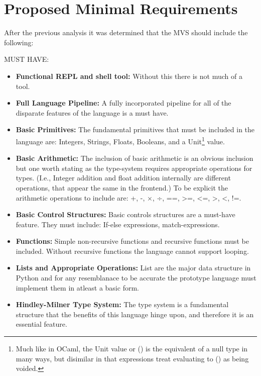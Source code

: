 \documentclass{l4proj}
\begin{document}


\section{Proposed Minimal Requirements}

After the previous analysis it was determined that the MVS should include the following:

MUST HAVE:
\begin{itemize}
    \item \textbf{Functional REPL and shell tool:} Without this there is not much of a tool.
    \item \textbf{Full Language Pipeline:} A fully incorporated pipeline for all of the disparate features of the language is a must have.
    \item \textbf{Basic Primitives:} The fundamental primitives that must be included in the language are: Integers, Strings, Floats, Booleans, and a Unit\footnote{Much like in OCaml, the Unit value or () is the equivalent of a null type in many ways, but disimilar in that expressions treat evaluating to () as being voided.} value.
    \item \textbf{Basic Arithmetic:} The inclusion of basic arithmetic is an obvious inclusion but one worth stating as the type-system requires appropriate operations for types.
    (I.e., Integer addition and float addition internally are different operations, that appear the same in the frontend.)
    To be explicit the arithmetic operations to include are: +, -, $\times$, ÷, ==, >=, <=, >, <, !=.
    \item \textbf{Basic Control Structures:} Basic controls structures are a must-have feature. They must include: If-else expressions, match-expressions.
    \item \textbf{Functions:} Simple non-recursive functions and recursive functions must be included. Without recursive functions the language cannot support looping.
    \item \textbf{Lists and Appropriate Operations:} List are the major data structure in Python and for any resemblanace to be accurate the prototype language must implement them in atleast a basic form.
    \item \textbf{Hindley-Milner Type System:} The type system is a fundamental structure that the benefits of this language hinge upon, and therefore it is an essential feature.
\end{itemize}
\end{document}
